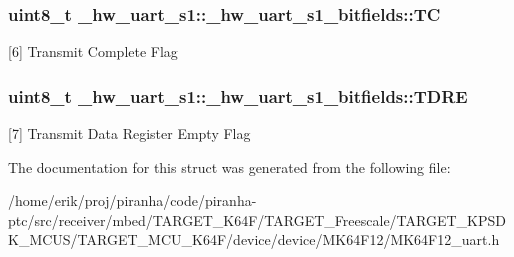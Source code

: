 \subsubsection[{\texorpdfstring{TC}{TC}}]{\setlength{\rightskip}{0pt plus 5cm}uint8\+\_\+t \+\_\+hw\+\_\+uart\+\_\+s1\+::\+\_\+hw\+\_\+uart\+\_\+s1\+\_\+bitfields\+::\+TC}\hypertarget{struct__hw__uart__s1_1_1__hw__uart__s1__bitfields_ad52b2f93a5a6f071b36410ba41faa6f5}{}\label{struct__hw__uart__s1_1_1__hw__uart__s1__bitfields_ad52b2f93a5a6f071b36410ba41faa6f5}
\mbox{[}6\mbox{]} Transmit Complete Flag 
\subsubsection[{\texorpdfstring{T\+D\+RE}{TDRE}}]{\setlength{\rightskip}{0pt plus 5cm}uint8\+\_\+t \+\_\+hw\+\_\+uart\+\_\+s1\+::\+\_\+hw\+\_\+uart\+\_\+s1\+\_\+bitfields\+::\+T\+D\+RE}\hypertarget{struct__hw__uart__s1_1_1__hw__uart__s1__bitfields_a6d75e49f17ffaa8b0db2fc139500ebb7}{}\label{struct__hw__uart__s1_1_1__hw__uart__s1__bitfields_a6d75e49f17ffaa8b0db2fc139500ebb7}
\mbox{[}7\mbox{]} Transmit Data Register Empty Flag 

The documentation for this struct was generated from the following file\+:\begin{DoxyCompactItemize}
\item 
/home/erik/proj/piranha/code/piranha-\/ptc/src/receiver/mbed/\+T\+A\+R\+G\+E\+T\+\_\+\+K64\+F/\+T\+A\+R\+G\+E\+T\+\_\+\+Freescale/\+T\+A\+R\+G\+E\+T\+\_\+\+K\+P\+S\+D\+K\+\_\+\+M\+C\+U\+S/\+T\+A\+R\+G\+E\+T\+\_\+\+M\+C\+U\+\_\+\+K64\+F/device/device/\+M\+K64\+F12/M\+K64\+F12\+\_\+uart.\+h\end{DoxyCompactItemize}
